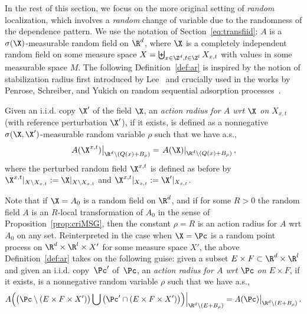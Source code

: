 In the rest of this section, we focus on the more original setting of \emph{random} localization, which involves a \emph{random} change of variable due to the randomness of the dependence pattern. We use the notation of Section~\ref{eq:transfiid}: $A$ is a $\sigma(\X)$-measurable random field on $\R^d$, where $\X$ is a completely independent random field on some measure space $X=\biguplus_{x\in\Z^d,t\in\Z^l}X_{x,t}$ with values in some measurable space $M$. The following Definition~\ref{def:ar} is inspired by the notion of stabilization radius first introduced by Lee~\cite{Lee-97,Lee-99} and crucially used in the works by Penrose, Schreiber, and Yukich on random sequential adsorption processes~\cite{Penrose-05,Penrose-Yukich-02,PY-05,Schreiber-Penrose-Yukich-07}.
\begin{defi}\label{def:ar}
Given an i.i.d. copy $\X'$ of the field $\X$, an \emph{ action radius for $A$ wrt $\X$ on $X_{x,t}$} (with reference perturbation $\X'$), if it exists, is defined as a nonnegative $\sigma(\X,\X')$-measurable random variable $\rho$ such that we have a.s.,
\[
\left.A(\X^{x,t})\right|_{\R^d\setminus (Q(x)+B_\rho)}=\left.A(\X)\right|_{\R^d\setminus(Q(x)+B_\rho)},
\]
where the perturbed random field $\X^{x,t}$ is defined as before by $\X^{x,t}|_{X\setminus X_{x,t}}:=\X|_{X\setminus X_{x,t}}$ and $\X^{x,t}|_{X_{x,t}}:=\X'|_{X_{x,t}}$.
\end{defi}
Note that if $\X=A_0$ is a random field on $\R^d$, and if for some $R>0$ the random field $A$ is an $R$-local transformation of $A_0$ in the sense of Proposition~\ref{prop:criMSG}, then the constant $\rho=R$ is an action radius for $A$ wrt $A_0$ on any set. Reinterpreted in the case when $\X=\Pc$ is a random point process on $\R^d\times\R^{l}\times X'$ for some measure space $X'$, the above Definition~\ref{def:ar} takes on the following guise: given a subset $E\times F\subset \R^d\times \R^{l}$ and given an i.i.d. copy~$\Pc'$ of~$\Pc$, an \emph{action radius for $A$ wrt $\Pc$ on $E\times F$}, if it exists, is a nonnegative random variable $\rho$ such that we have a.s.,
\[
A\Big(\big(\Pc\setminus (E\times F\times X')\big)\bigcup \big(\Pc'\cap (E\times F\times X')\big)\Big)\Big|_{\R^d\setminus (E+B_\rho)}=A(\Pc)\big|_{\R^d\setminus (E+B_\rho)}\,.
\]

